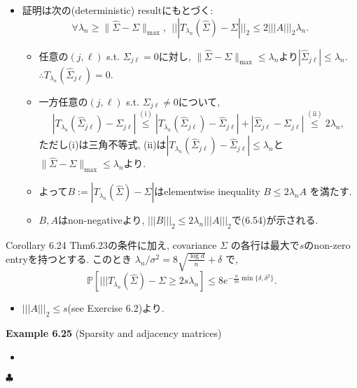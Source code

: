 \documentclass[unicode,aspectratio=169,11pt]{beamer}
\def\endexample{\hfill $\clubsuit$}
\newcommand{\bb}{\mathbb}
\begin{document}
\begin{frame}{}{}
  \begin{itemize}
    \item 証明は次の(deterministic) resultにもとづく:
          \[\forall \lambda_n \ge \|\widehat{\Sigma} - \Sigma\|_{\max},\ \ |||T_{\lambda_n}(\widehat{\Sigma}) - \Sigma|||_2 \le 2|||A|||_2 \lambda_n. \tag{6.54}\]
          \begin{itemize}
            \item 任意の$(j,\ell)$ s.t. $\Sigma_{j\ell} = 0$に対し, $\|\widehat{\Sigma} - \Sigma\|_{\max} \le \lambda_n$より$|\widehat{\Sigma}_{j\ell}| \le \lambda_n$. $\therefore T_{\lambda_n}(\widehat{\Sigma}_{j\ell}) = 0$.
            \item 一方任意の$(j,\ell)$ s.t. $\Sigma_{j\ell} \ne 0$について,
                  \[
                    \left|T_{\lambda_{n}}\left(\widehat{\Sigma}_{j \ell}\right)-\Sigma_{j \ell}\right|
                    \stackrel{(\mathrm{i})}{\leq}\left|T_{\lambda_{n}}\left(\widehat{\Sigma}_{j \ell}\right)-\widehat{\Sigma}_{j \ell}\right|+\left|\widehat{\Sigma}_{j \ell}-\Sigma_{j \ell}\right|
                    \stackrel{(\mathrm{ii})}{\leq} 2 \lambda_{n},
                  \]
                  ただし(i)は三角不等式, (ii)は$\left|T_{\lambda_{n}}\left(\widehat{\Sigma}_{j \ell}\right)-\widehat{\Sigma}_{j \ell}\right| \le \lambda_n$と$\|\widehat{\Sigma}-\Sigma\|_{\max} \le \lambda_n$より.
            \item よって$B := |T_{\lambda_n}(\widehat{\Sigma}) - \Sigma|$はelementwise inequality $B \le 2 \lambda_n A$ を満たす.
            \item $B, A$はnon-negativeより, $|||B|||_2 \le 2 \lambda_n |||A|||_2$で(6.54)が示される.
          \end{itemize}
  \end{itemize}
\end{frame}

\begin{frame}{}{}
  \begin{block}{Corollary 6.24}
    Thm6.23の条件に加え, covariance $\Sigma$ の各行は最大で$s$のnon-zero entryを持つとする.
    このとき $\lambda_n/\sigma^2 = 8\sqrt{\frac{\log d}{n}} + \delta$ で,
    \[\bb{P}[|||T_{\lambda_n}(\widehat{\Sigma}) - \Sigma \ge 2 s \lambda_n] \le 8e^{-\frac{n}{16}\min\{\delta, \delta^2\}}. \tag{6.55}\]
  \end{block}
  \begin{itemize}
    \item $|||A|||_2 \le s$(see Exercise 6.2)より.
  \end{itemize}
\end{frame}

\begin{frame}{}{}
  {\bf Example 6.25} (Sparsity and adjacency matrices)
  \begin{itemize}
    \item 
  \end{itemize}
  \endexample
\end{frame}
\end{document}
